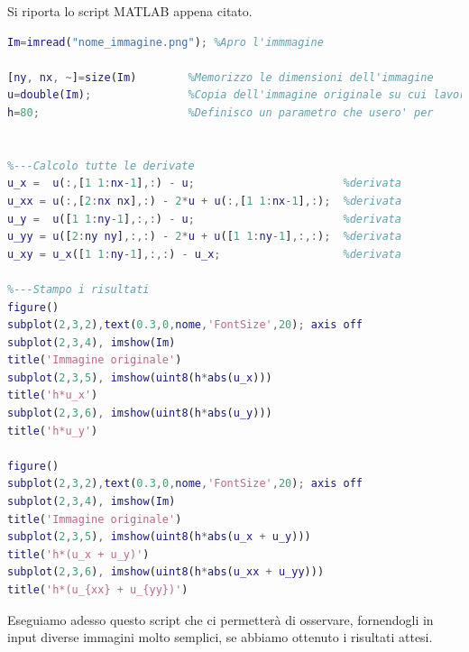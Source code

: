 \newpage
Si riporta lo script MATLAB appena citato.
\vspace{1em}
\begin{lstlisting}[language=MATLAB]
%---Operazioni preliminari
Im=imread("nome_immagine.png");	%Apro l'immmagine

[ny, nx, ~]=size(Im)        %Memorizzo le dimensioni dell'immagine
u=double(Im);               %Copia dell'immagine originale su cui lavorare
h=80;                       %Definisco un parametro che usero' per                               enfatizzare i bordi in fase di stampa 


%---Calcolo tutte le derivate
u_x =  u(:,[1 1:nx-1],:) - u;                       %derivata                                                            prima lungo x
u_xx = u(:,[2:nx nx],:) - 2*u + u(:,[1 1:nx-1],:);  %derivata                                                            seconda lungo x
u_y =  u([1 1:ny-1],:,:) - u;                       %derivata                                                            prima lungo y
u_yy = u([2:ny ny],:,:) - 2*u + u([1 1:ny-1],:,:);  %derivata                                                            seconda lungo y
u_xy = u_x([1 1:ny-1],:,:) - u_x;                   %derivata                                                            seconda mista
   
%---Stampo i risultati
figure()
subplot(2,3,2),text(0.3,0,nome,'FontSize',20); axis off
subplot(2,3,4), imshow(Im)
title('Immagine originale')
subplot(2,3,5), imshow(uint8(h*abs(u_x)))
title('h*u_x')
subplot(2,3,6), imshow(uint8(h*abs(u_y)))
title('h*u_y')

figure()
subplot(2,3,2),text(0.3,0,nome,'FontSize',20); axis off
subplot(2,3,4), imshow(Im)
title('Immagine originale')
subplot(2,3,5), imshow(uint8(h*abs(u_x + u_y)))
title('h*(u_x + u_y)')
subplot(2,3,6), imshow(uint8(h*abs(u_xx + u_yy)))
title('h*(u_{xx} + u_{yy})')
\end{lstlisting}

\vspace{1em}
Eseguiamo adesso questo script che ci permetterà di osservare, fornendogli in input diverse immagini molto semplici, se abbiamo ottenuto i risultati attesi.\\
\newpage
